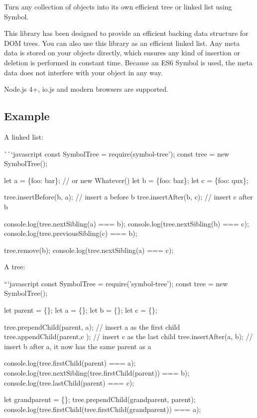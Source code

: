 \href{https://travis-ci.org/jsdom/js-symbol-tree}{\tt } \href{https://coveralls.io/github/jsdom/js-symbol-tree?branch=master}{\tt }

Turn any collection of objects into its own efficient tree or linked list using {\ttfamily Symbol}.

This library has been designed to provide an efficient backing data structure for D\+OM trees. You can also use this library as an efficient linked list. Any meta data is stored on your objects directly, which ensures any kind of insertion or deletion is performed in constant time. Because an E\+S6 {\ttfamily Symbol} is used, the meta data does not interfere with your object in any way.

Node.\+js 4+, io.\+js and modern browsers are supported.

\subsection*{Example }

A linked list\+:

\`{}\`{}`javascript const Symbol\+Tree = require(\textquotesingle{}symbol-\/tree'); const tree = new Symbol\+Tree();

let a = \{foo\+: \textquotesingle{}bar\textquotesingle{}\}; // or {\ttfamily new Whatever()} let b = \{foo\+: \textquotesingle{}baz\textquotesingle{}\}; let c = \{foo\+: \textquotesingle{}qux\textquotesingle{}\};

tree.\+insert\+Before(b, a); // insert a before b tree.\+insert\+After(b, c); // insert c after b

console.\+log(tree.\+next\+Sibling(a) === b); console.\+log(tree.\+next\+Sibling(b) === c); console.\+log(tree.\+previous\+Sibling(c) === b);

tree.\+remove(b); console.\+log(tree.\+next\+Sibling(a) === c); 
\begin{DoxyCode}
A tree:

```javascript
const SymbolTree = require('symbol-tree');
const tree = new SymbolTree();

let parent = \{\};
let a = \{\};
let b = \{\};
let c = \{\};

tree.prependChild(parent, a); // insert a as the first child
tree.appendChild(parent,c ); // insert c as the last child
tree.insertAfter(a, b); // insert b after a, it now has the same parent as a

console.log(tree.firstChild(parent) === a);
console.log(tree.nextSibling(tree.firstChild(parent)) === b);
console.log(tree.lastChild(parent) === c);

let grandparent = \{\};
tree.prependChild(grandparent, parent);
console.log(tree.firstChild(tree.firstChild(grandparent)) === a);
\end{DoxyCode}


